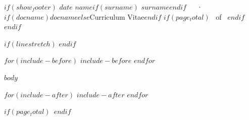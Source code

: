 \documentclass[$if(fontsize)$$fontsize$$else$11pt$endif$,$if(lang)$$babel-lang$,$endif$$if(papersize)$$papersize$$else$a4paper$endif$,$for(classoption)$$classoption$$sep$,$endfor$]{awesome-cv}
\begin{document}
\makecvheader

$if(show_footer)$
\makecvfooter
  {$date$}
    {$name$$if(surname)$ $surname$$endif$~~~·~~~$if(docname)$$docname$$else$Curriculum Vitae$endif$}
  {\thepage$if(page_total)$~ of \pageref{LastPage}~$endif$}
$endif$


$if(linestretch)$
$endif$

$for(include-before)$
$include-before$
$endfor$

$body$

$for(include-after)$
$include-after$
$endfor$

$if(page_total)$\label{LastPage}~$endif$
\end{document}
